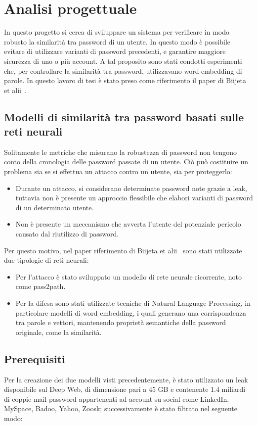 \chapter{Analisi progettuale}
\label{ch:analisi progettuale}

In questo progetto si cerca di sviluppare un sistema per verificare in modo robusto la similarità tra password di un utente. In questo modo è possibile evitare di utilizzare varianti di password precedenti, e garantire maggiore sicurezza di uno o più account.
A tal proposito sono stati condotti esperimenti che, per controllare la similarità tra password, utilizzavano word embedding di parole. In questo lavoro di tesi è stato preso come riferimento il paper di Biijeta  et alii~\cite{biijeta}.

\section{Modelli di similarità tra password basati sulle reti neurali}
\label{sec:modelli di similarita tra password basati sulle reti neurali}
Solitamente le metriche che misurano la robustezza di password non tengono conto della cronologia delle password passate di un utente.
Ciò può costituire un problema sia se si effettua un attacco contro un utente, sia per proteggerlo:
\begin{itemize}
    \item Durante un attacco, si considerano determinate password note grazie a leak, tuttavia non è presente un approccio flessibile che elabori varianti di password di un determinato utente.
    \item Non è presente un meccanismo che avverta l'utente del potenziale pericolo causato dal riutilizzo di password.
\end{itemize}
Per questo motivo, nel paper riferimento di Biijeta et alii~\cite{biijeta} sono stati utilizzate due tipologie di reti neurali:
\begin{itemize}
    \item Per l'attacco è stato sviluppato un modello di rete neurale ricorrente, noto come pass2path.
    \item Per la difesa sono stati utilizzate tecniche di Natural Language Processing, in particolare modelli di word embedding, i quali generano una corrispondenza tra parole e vettori, mantenendo proprietà semantiche della password originale, come la similarità.
\end{itemize}

\section{Prerequisiti}
\label{sec:prerequisiti}
Per la creazione dei due modelli visti precedentemente, è stato utilizzato un leak disponibile sul Deep Web, di dimensione pari a 45 GB e contenente 1.4 miliardi di coppie mail-password appartenenti ad account su social come LinkedIn, MySpace, Badoo, Yahoo, Zoosk; successivamente è stato filtrato nel seguente modo:

